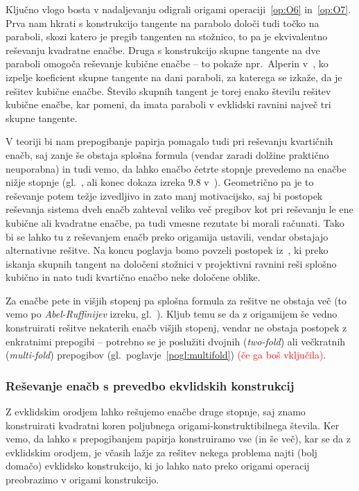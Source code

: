 Ključno vlogo bosta v nadaljevanju odigrali origami operaciji~\ref{op:O6} in~\ref{op:O7}. Prva nam hkrati s konstrukcijo tangente na parabolo določi tudi točko na paraboli, skozi katero je pregib tangenten na stožnico, to pa je ekvivalentno reševanju kvadratne enačbe. Druga s konstrukcijo skupne tangente na dve paraboli omogoča reševanje kubične enačbe -- to pokaže npr.\ Alperin v~\cite[str.\ 129]{alperin2000}, ko izpelje koeficient skupne tangente na dani paraboli, za katerega se izkaže, da je rešitev kubične enačbe. Število skupnih tangent je torej enako številu rešitev kubične enačbe, kar pomeni, da imata paraboli v evklidski ravnini največ tri skupne tangente.

V teoriji bi nam prepogibanje papirja pomagalo tudi pri reševanju kvartičnih enačb, saj zanje še obstaja splošna formula (vendar zaradi dolžine praktično neuporabna) in tudi vemo, da lahko enačbo četrte stopnje prevedemo na enačbe nižje stopnje (gl.\ \cite{quartics2012}, \cite{wikiquartic} ali konec dokaza izreka $9.8$ v~\cite[str.\ 134]{geometricconstructions}). Geometrično pa je to reševanje potem težje izvedljivo in zato manj motivacijsko, saj bi postopek reševanja sistema dveh enačb zahteval veliko več pregibov kot pri reševanju le ene kubične ali kvadratne enačbe, pa tudi vmesne rezutate bi morali računati. Tako bi se lahko tu z reševanjem enačb preko origamija ustavili, vendar obstajajo alternativne rešitve. Na koncu poglavja bomo povzeli postopek iz~\cite{edwards2001}, ki preko iskanja skupnih tangent na določeni stožnici v projektivni ravnini reši splošno kubično in nato tudi kvartično enačbo neke določene oblike.

Za enačbe pete in višjih stopenj pa splošna formula za rešitve ne obstaja več (to vemo po \emph{Abel-Ruffinijev} izreku, gl.\ \cite{mrinal2019}). Kljub temu se da z origamijem še vedno konstruirati rešitve nekaterih enačb višjih stopenj, vendar ne obstaja postopek z enkratnimi prepogibi -- potrebno se je poslužiti dvojnih (\emph{two-fold}) ali večkratnih (\emph{multi-fold}) prepogibov (gl.\ poglavje~\ref{pogl:multifold}) \textcolor{red}{(če ga boš vključila)}.

\subsubsection*{Reševanje enačb s prevedbo ekvlidskih konstrukcij}

Z evklidskim orodjem lahko rešujemo enačbe druge stopnje, saj znamo konstruirati kvadratni koren poljubnega origami-konstruktibilnega števila. Ker vemo, da lahko s prepogibanjem papirja konstruiramo vse (in še več), kar se da z evklidskim orodjem, je včasih lažje za rešitev nekega problema najti (bolj domačo) evklidsko konstrukcijo, ki jo lahko nato preko origami operacij preobrazimo v origami konstrukcijo.

